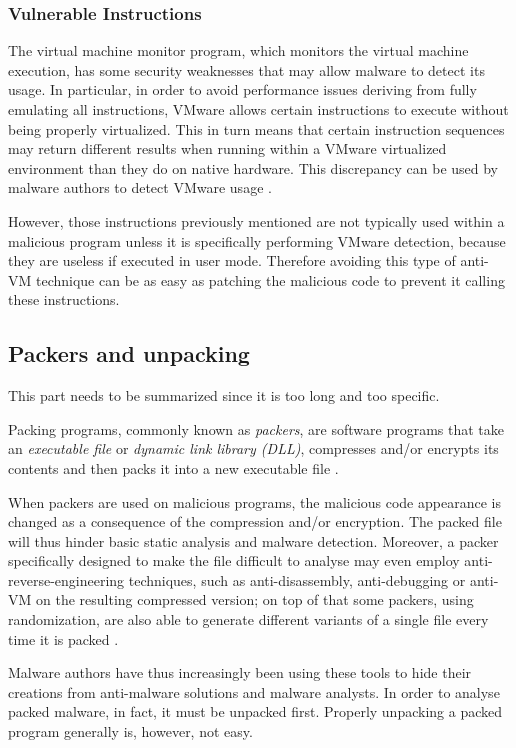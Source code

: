 \documentclass[pdfa%
,cucitura%
]{toptesi}
\begin{document}
\subsubsection{Vulnerable Instructions}
The virtual machine monitor program, which monitors the virtual machine execution, has some security weaknesses that may allow malware to detect its usage. In particular, in order to avoid performance issues deriving from fully emulating all instructions, VMware allows certain instructions to execute without being properly virtualized. This in turn means that certain instruction sequences may return different results when running within a VMware virtualized environment than they do on native hardware. This discrepancy can be used by malware authors to detect VMware usage \cite{SikorskiPMA}.

However, those instructions previously mentioned are not typically used within a malicious program unless it is specifically performing VMware detection, because they are useless if executed in user mode. Therefore avoiding this type of anti-VM technique can be as easy as patching the malicious code to prevent it calling these instructions.

\subsection{Packers and unpacking}
\color{Green}
This part needs to be summarized since it is too long and too specific.
\color{Black}

Packing programs, commonly known as \textit{packers}, are software programs that take an \textit{executable file} or \textit{dynamic link library (DLL)}, compresses and/or encrypts its contents and then packs it into a new executable file \cite{SikorskiPMA}.

When packers are used on malicious programs, the malicious code appearance is changed as a consequence of the compression and/or encryption. The packed file will thus hinder basic static analysis and malware detection. Moreover, a packer specifically designed to make the file difficult to analyse may even employ anti-reverse-engineering techniques, such as anti-disassembly, anti-debugging or anti-VM on the resulting compressed version; on top of that some packers, using randomization, are also able to generate different variants of a single file every time it is packed \cite{LiPRTCMP}.

Malware authors have thus increasingly been using these tools to hide their creations from anti-malware solutions and malware analysts. In order to analyse packed malware, in fact, it must be unpacked first. Properly unpacking a packed program generally is, however, not easy.
\end{document}

